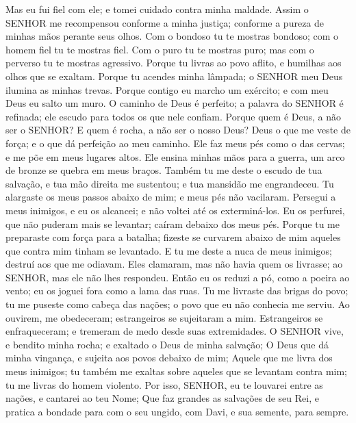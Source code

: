 {Mas eu fui fiel com ele; e tomei cuidado contra minha maldade.
Assim o SENHOR me recompensou conforme a minha justiça; conforme a pureza de minhas mãos perante seus olhos.
Com o bondoso tu te mostras bondoso;
{} com o homem fiel tu te mostras fiel.
Com o puro tu te mostras puro; mas com o perverso tu te mostras agressivo.
Porque tu livras ao povo aflito, e humilhas aos olhos que se exaltam.
Porque tu acendes minha lâmpada; o SENHOR meu Deus ilumina as minhas trevas.
Porque contigo eu marcho
{} um exército; e com meu Deus eu salto um muro.
O caminho de Deus é perfeito; a palavra do SENHOR é refinada; ele
{} escudo para todos os que nele confiam.
Porque quem é Deus, a não ser o SENHOR? E quem é rocha, a não ser o nosso Deus?
Deus
{} o que me veste de força; e o que dá perfeição ao meu caminho.
Ele faz meus pés como o das cervas; e me põe em meus lugares altos.
Ele ensina minhas mãos para a guerra,
{} um arco de bronze se quebra em meus braços.
Também tu me deste o escudo de tua salvação, e tua mão direita me sustentou; e tua mansidão me engrandeceu.
Tu alargaste os meus passos abaixo de mim; e meus pés não vacilaram.
Persegui a meus inimigos, e eu os alcancei; e não voltei até os exterminá-los.
Eu os perfurei, que não puderam mais se levantar; caíram debaixo dos meus pés.
Porque tu me preparaste com força para a batalha; fizeste se curvarem abaixo de mim aqueles que contra mim tinham se levantado.
E tu me deste a nuca de meus inimigos; destruí aos que me odiavam.
Eles clamaram, mas não havia quem os livrasse;
{} ao SENHOR, mas ele não lhes respondeu.
Então eu os reduzi a pó, como a poeira ao vento; eu os joguei fora como a lama das ruas.
Tu me livraste das brigas do povo; tu me puseste como cabeça das nações; o povo que eu não conhecia me serviu.
Ao
{} ouvirem,
{} me obedeceram; estrangeiros se sujeitaram a mim.
Estrangeiros se enfraqueceram; e tremeram de medo desde suas extremidades.
O SENHOR vive, e bendito
{} minha rocha; e exaltado
{} o Deus de minha salvação;
O Deus que dá minha vingança, e sujeita aos povos debaixo de mim;
Aquele que me livra dos meus inimigos; tu também me exaltas sobre aqueles que se levantam contra mim; tu me livras do homem violento.
Por isso, SENHOR, eu te louvarei entre as nações, e cantarei ao teu Nome;
Que faz grandes as salvações de seu Rei, e pratica a bondade para com o seu ungido, com Davi, e sua semente, para sempre.

}
